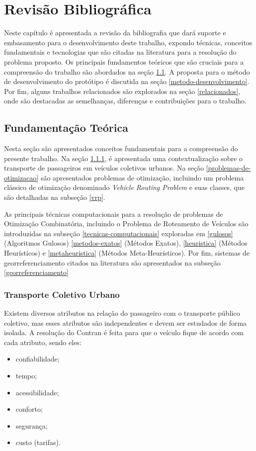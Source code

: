 \chapter{Revisão Bibliográfica}

Neste capítulo é apresentada a revisão da bibliografia que dará suporte e embasamento para o desenvolvimento deste trabalho, expondo técnicas, conceitos fundamentais e tecnologias que são citadas na literatura para a resolução do problema proposto. Os principais fundamentos teóricos que são cruciais para a compreensão do trabalho são abordados na seção \ref{fundamentacao}. A proposta para o método de desenvolvimento do protótipo é discutida na seção \ref{metodo-desenvolvimento}. Por fim, alguns trabalhos relacionados são explorados na seção \ref{relacionados}, onde são destacadas as semelhanças, diferenças e contribuições para o trabalho.

\section{Fundamentação Teórica}\label{fundamentacao}
Nesta seção são apresentados conceitos fundamentais para a compreensão do presente trabalho. Na seção \ref{transporte-urbano}, é apresentada uma contextualização sobre o transporte de passageiros em veículos coletivos urbanos. Na seção \ref{problemas-de-otimizacao} são apresentados problemas de otimização, incluindo um problema clássico de otimização denominado \emph{Vehicle Routing Problem} e suas classes, que são detalhadas na subseção \ref{vrp}. 

As principais técnicas computacionais para a resolução de problemas de Otimização Combinatória, incluindo o Problema de Roteamento de Veículos são introduzidas na subseção \ref{tecnicas-computacionais} exploradas em \ref{gulosos} (Algoritmos Gulosos) \ref{metodos-exatos} (Métodos Exatos), \ref{heuristica} (Métodos Heurísticos) e \ref{metaheuristica} (Métodos Meta-Heurísticos). Por fim, sistemas de georreferenciamento citados na literatura são apresentados na subseção \ref{georreferenciamento}

\subsection{Transporte Coletivo Urbano}\label{transporte-urbano}
Existem diversos atributos na relação do passageiro com o transporte público coletivo, mas esses atributos são independentes e devem ser estudados de forma isolada. A resolução do Contran \cite{denatran} é feita para que o veículo fique de acordo com cada atributo, sendo eles:
\begin{itemize}
    \item confiabilidade;
    \item tempo;
    \item acessibilidade;
    \item conforto;
    \item segurança;
    \item custo (tarifas).
\end{itemize}

